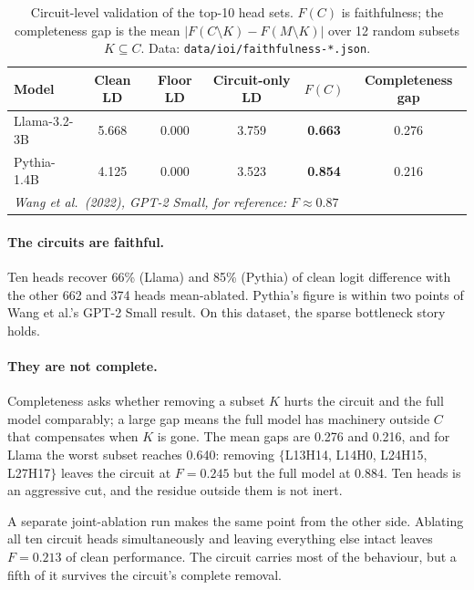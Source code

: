 \documentclass[11pt,a4paper]{article}
\begin{document}
\begin{table}[H]
  \centering
  \caption{Circuit-level validation of the top-10 head sets. $F(C)$ is faithfulness;
    the completeness gap is the mean $|F(C \setminus K) - F(M \setminus K)|$ over 12
    random subsets $K \subseteq C$. Data: \texttt{data/ioi/faithfulness-*.json}.}
  \label{tab:faithfulness}
  \smallskip
  \begin{tabular}{lccccc}
    \toprule
    Model & Clean LD & Floor LD & Circuit-only LD & $F(C)$ & Completeness gap \\
    \midrule
    Llama-3.2-3B & 5.668 & 0.000 & 3.759 & \textbf{0.663} & 0.276 \\
    Pythia-1.4B  & 4.125 & 0.000 & 3.523 & \textbf{0.854} & 0.216 \\
    \midrule
    \multicolumn{6}{l}{\emph{Wang et al.\ (2022), GPT-2 Small, for reference:} $F \approx 0.87$} \\
    \bottomrule
  \end{tabular}
\end{table}

\paragraph{The circuits are faithful.} Ten heads recover 66\% (Llama) and 85\% (Pythia)
of clean logit difference with the other 662 and 374 heads mean-ablated. Pythia's figure
is within two points of Wang et al.'s GPT-2 Small result. On this dataset, the sparse
bottleneck story holds.

\paragraph{They are not complete.} Completeness asks whether removing a subset $K$ hurts
the circuit and the full model comparably; a large gap means the full model has machinery
outside $C$ that compensates when $K$ is gone. The mean gaps are 0.276 and 0.216, and for
Llama the worst subset reaches 0.640: removing $\{$L13H14, L14H0, L24H15, L27H17$\}$
leaves the circuit at $F = 0.245$ but the full model at 0.884. Ten heads is an aggressive
cut, and the residue outside them is not inert.

A separate joint-ablation run makes the same point from the other side. Ablating all ten
circuit heads simultaneously and leaving everything else intact leaves $F = 0.213$ of
clean performance. The circuit carries most of the behaviour, but a fifth of it survives
the circuit's complete removal.
\end{document}
